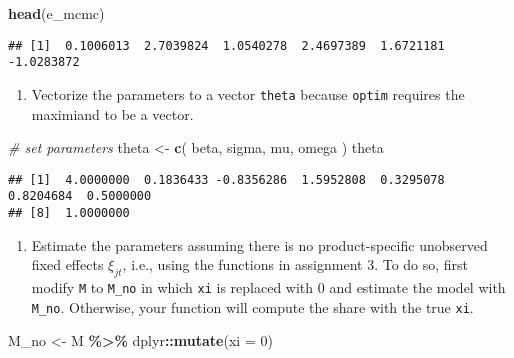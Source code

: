 \documentclass[
]{book}
\newenvironment{Shaded}{\begin{snugshade}}{\end{snugshade}}
\newcommand{\AttributeTok}[1]{\textcolor[rgb]{0.13,0.29,0.53}{#1}}
\newcommand{\CommentTok}[1]{\textcolor[rgb]{0.56,0.35,0.01}{\textit{#1}}}
\newcommand{\DecValTok}[1]{\textcolor[rgb]{0.00,0.00,0.81}{#1}}
\newcommand{\FunctionTok}[1]{\textcolor[rgb]{0.13,0.29,0.53}{\textbf{#1}}}
\newcommand{\NormalTok}[1]{#1}
\newcommand{\OtherTok}[1]{\textcolor[rgb]{0.56,0.35,0.01}{#1}}
\newcommand{\SpecialCharTok}[1]{\textcolor[rgb]{0.81,0.36,0.00}{\textbf{#1}}}
\providecommand{\tightlist}{%
  \setlength{\itemsep}{0pt}\setlength{\parskip}{0pt}}
\begin{document}
\begin{Shaded}
\begin{Highlighting}[]
\FunctionTok{head}\NormalTok{(e\_mcmc)}
\end{Highlighting}
\end{Shaded}

\begin{verbatim}
## [1]  0.1006013  2.7039824  1.0540278  2.4697389  1.6721181 -1.0283872
\end{verbatim}

\begin{enumerate}
\def\labelenumi{\arabic{enumi}.}
\setcounter{enumi}{1}
\tightlist
\item
  Vectorize the parameters to a vector \texttt{theta} because \texttt{optim} requires the maximiand to be a vector.
\end{enumerate}

\begin{Shaded}
\begin{Highlighting}[]
\CommentTok{\# set parameters}
\NormalTok{theta }\OtherTok{\textless{}{-}} 
  \FunctionTok{c}\NormalTok{(}
\NormalTok{    beta, }
\NormalTok{    sigma, }
\NormalTok{    mu, }
\NormalTok{    omega}
\NormalTok{    )}
\NormalTok{theta}
\end{Highlighting}
\end{Shaded}

\begin{verbatim}
## [1]  4.0000000  0.1836433 -0.8356286  1.5952808  0.3295078  0.8204684  0.5000000
## [8]  1.0000000
\end{verbatim}

\begin{enumerate}
\def\labelenumi{\arabic{enumi}.}
\setcounter{enumi}{2}
\tightlist
\item
  Estimate the parameters assuming there is no product-specific unobserved fixed effects \(\xi_{jt}\), i.e., using the functions in assignment 3. To do so, first modify \texttt{M} to \texttt{M\_no} in which \texttt{xi} is replaced with 0 and estimate the model with \texttt{M\_no}. Otherwise, your function will compute the share with the true \texttt{xi}.
\end{enumerate}

\begin{Shaded}
\begin{Highlighting}[]
\NormalTok{M\_no }\OtherTok{\textless{}{-}} 
\NormalTok{  M }\SpecialCharTok{\%\textgreater{}\%}
\NormalTok{  dplyr}\SpecialCharTok{::}\FunctionTok{mutate}\NormalTok{(}\AttributeTok{xi =} \DecValTok{0}\NormalTok{)}
\end{Highlighting}
\end{Shaded}
\end{document}
